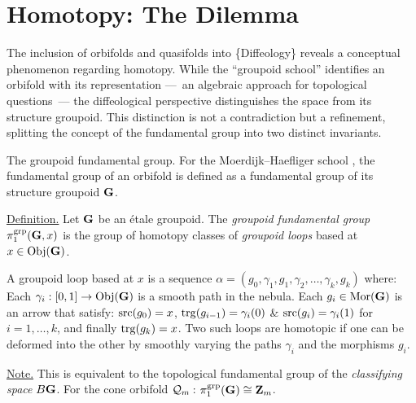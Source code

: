 
\section{Homotopy: The Dilemma}

The inclusion of orbifolds and quasifolds into \{Diffeology\} reveals a conceptual phenomenon regarding homotopy.
While the ``groupoid school'' identifies an orbifold with its representation
---~an algebraic approach for topological questions~---
the diffeological perspective distinguishes the space from its structure groupoid.
This distinction is not a contradiction but a refinement, splitting the concept of the fundamental group into two distinct invariants.

\begin{Article}{The groupoid fundamental group.}{}
  For the Moerdijk--Haefliger school \cite{Moe02},
  the fundamental group of an orbifold is defined as a fundamental group of its structure groupoid ${\mathbf G}$.
  
  \uline{Definition.} Let ${\mathbf G}$ be an \'etale groupoid.
  The \emph{groupoid fundamental group} $\pi_1^{\text{grp}}({\mathbf G}, x)$ is the group of homotopy classes of \emph{groupoid loops} based at $x \in {\operatorname{Obj}}({\mathbf G})$.
  
  A groupoid loop based at $x$ is a sequence $\alpha = (g_0, \gamma_1, g_1, \gamma_2, \dots, \gamma_k, g_k)$ where:
  Each $\gamma_i: [0,1] \to {\operatorname{Obj}}({\mathbf G})$ is a smooth path in the nebula.
  Each $g_i \in {\operatorname{Mor}}({\mathbf G})$ is an arrow that satisfy:
  $\mathrm{src}(g_0) = x$,
  $\mathrm{trg}(g_{i-1}) = \gamma_i(0)$ \& $\mathrm{src}(g_i) = \gamma_i(1)$ for $i = 1,\dots,k$,
  and finally $\mathrm{trg}(g_k) = x$.
  Two such loops are homotopic if one can be deformed into the other by smoothly varying the paths $\gamma_i$ and the morphisms $g_i$.
  
  \uline{Note.} This is equivalent to the topological fundamental group of the \emph{classifying space} $B{\mathbf G}$.
  For the cone orbifold $\mathcal{Q}_m$\,:
  $\pi_1^{\text{grp}}({\mathbf G}) \cong \mathbf{Z}_m$.
\end{Article}

